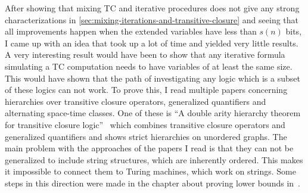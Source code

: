 After showing that mixing TC and iterative procedures does not give any strong characterizations in \cref{sec:mixing-iterations-and-transitive-closure} and seeing that all improvements happen when the extended variables have less than $s(n)$ bits, I came up with an idea that took up a lot of time and yielded very little results.
A very interesting result would have been to show that any iterative formula simulating a TC computation needs to have variables of at least the same size.
This would have shown that the path of investigating any logic which is a subset of these logics can not work.
To prove this, I read multiple papers concerning hierarchies over transitive closure operators, generalized quantifiers and alternating space-time classes.
One of these is ``A double arity hierarchy theorem for transitive closure logic''~\cite{Grohe1996} which combines transitive closure operators and generalized quantifiers and shows strict hierarchies on unordered graphs.
The main problem with the approaches of the papers I read is that they can not be generalized to include string structures, which are inherently ordered.
This makes it impossible to connect them to Turing machines, which work on strings.
Some steps in this direction were made in the chapter about proving lower bounds in~\cite{descriptive-complexity}.